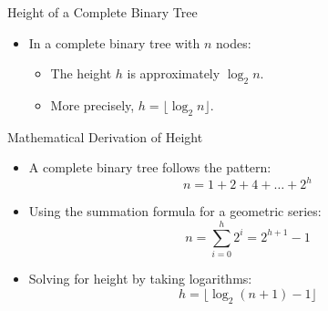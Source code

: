 \begin{frame}{Height of a Complete Binary Tree}
    \begin{itemize}
        \item In a complete binary tree with \( n \) nodes:
        \begin{itemize}
            \item The height \( h \) is approximately \( \log_2 n \).
            \item More precisely, \( h = \lfloor \log_2 n \rfloor \).
        \end{itemize}
    \end{itemize}
    \pause
    \centering
\end{frame}

\begin{frame}{Mathematical Derivation of Height}
    \begin{itemize}
        \item A complete binary tree follows the pattern:
        \begin{equation}
            n = 1 + 2 + 4 + \dots + 2^h
        \end{equation}
        \item Using the summation formula for a geometric series:
        \begin{equation}
            n = \sum_{i=0}^{h} 2^i = 2^{h+1} - 1
        \end{equation}
        \item Solving for height by taking logarithms:
        \begin{equation}
            h = \lfloor \log_2(n + 1) - 1 \rfloor
        \end{equation}
    \end{itemize}
\end{frame}

